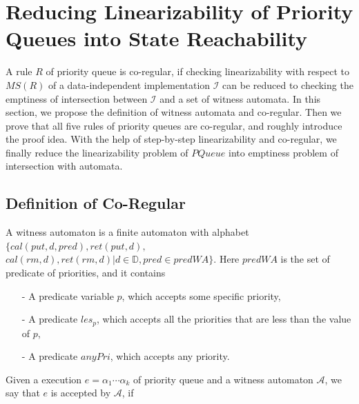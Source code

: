 \section{Reducing Linearizability of Priority Queues into State Reachability}
\label{sec:co-regular of priority queues}

A rule $R$ of priority queue is co-regular, if checking linearizability with respect to $\textit{MS}(R)$ of a data-independent implementation $\mathcal{I}$ can be reduced to checking the emptiness of intersection between $\mathcal{I}$ and a set of witness automata. In this section, we propose the definition of witness automata and co-regular. Then we prove that all five rules of priority queues are co-regular, and roughly introduce the proof idea. With the help of step-by-step linearizability and co-regular, we finally reduce the linearizability problem of $\textit{PQueue}$ into emptiness problem of intersection with automata.



\subsection{Definition of Co-Regular}
\label{subsec:definition of co-regular}

A witness automaton is a finite automaton with alphabet $\{ \textit{cal}(\textit{put},d,\textit{pred}), \textit{ret}(\textit{put},d),$ $\textit{cal}(\textit{rm},d),\textit{ret}(\textit{rm},d) \vert d \in \mathbb{D},\textit{pred} \in \textit{predWA} \}$. Here $\textit{predWA}$ is the set of predicate of priorities, and it contains

\begin{itemize}
\setlength{\itemsep}{0.5pt}
\item[-] A predicate variable $p$, which accepts some specific priority,

\item[-] A predicate $\textit{les}_p$, which accepts all the priorities that are less than the value of $p$,

\item[-] A predicate $\textit{anyPri}$, which accepts any priority.
\end{itemize}

Given a execution $e = \alpha_1 \cdots \alpha_k$ of priority queue and a witness automaton $\mathcal{A}$, we say that $e$ is accepted by $\mathcal{A}$, if

